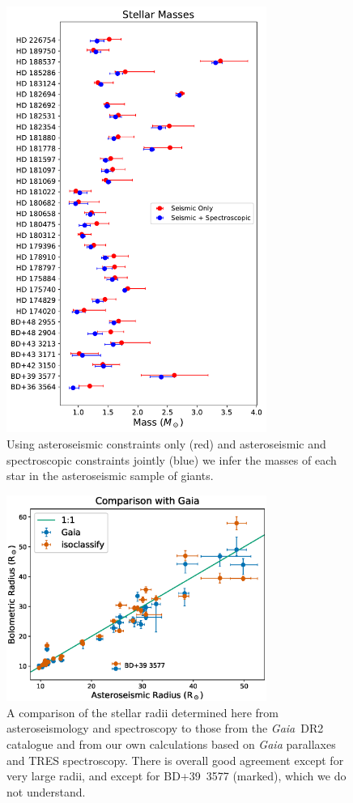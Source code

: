 \documentclass[a4paper,fleqn,usenatbib]{mnras}
\newcommand{\gaia}{\textit{Gaia}\xspace}
\begin{document}
\begin{figure}
\noindent\includegraphics[width=8.5cm,keepaspectratio]{different_constraints_ben.pdf}

\caption{\label{masses}
Using asteroseismic constraints only (red) and asteroseismic and spectroscopic constraints jointly (blue) we infer the masses of each star in the asteroseismic sample of giants.}
\end{figure}



\begin{figure}
\noindent\includegraphics[width=8.5cm,keepaspectratio]{combined_radii.eps}

\caption{\label{gaia_comparison}
A comparison of the stellar radii determined here from asteroseismology and spectroscopy to those from the \gaia~DR2 catalogue and from our own calculations based on \gaia parallaxes and TRES spectroscopy. There is overall good agreement except for very large radii, and except for BD+39~3577 (marked), which we do not understand.}
\end{figure}
\end{document}
